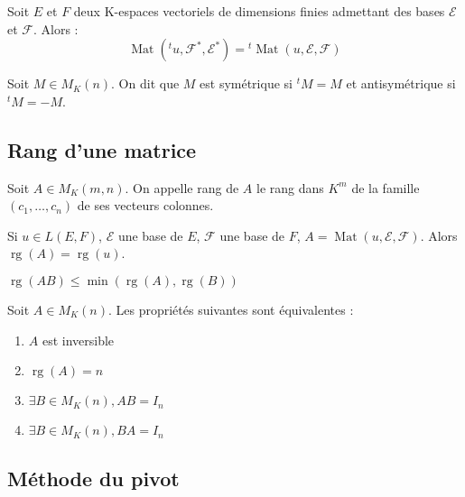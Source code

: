 \begin{thm}
Soit $E$ et $F$ deux K-espaces vectoriels de dimensions finies admettant des bases $\mathcal{E}$ et $\mathcal{F}$. Alors :
\[ \operatorname{Mat}({}^tu,\mathcal{F}^*,\mathcal{E}^*) = {}^t\operatorname{Mat}(u,\mathcal{E},\mathcal{F}) \]
\end{thm}

\begin{de}
Soit $M \in M_K(n)$. On dit que $M$ est symétrique si ${}^tM = M$ et antisymétrique si ${}^tM = -M$.
\end{de}

\subsection{Rang d'une matrice}

\begin{de}
Soit $A \in M_K(m,n)$. On appelle rang de $A$ le rang dans $K^m$ de la famille $(c_1,\ldots,c_n)$ de ses vecteurs colonnes.
\end{de}

\begin{thm}
Si $u \in L(E,F)$, $\mathcal{E}$ une base de $E$, $\mathcal{F}$ une base de $F$, $A = \operatorname{Mat}(u,\mathcal{E},\mathcal{F})$. Alors $\operatorname{rg}(A) = \operatorname{rg}(u)$.
\end{thm}

\begin{cor}
$\operatorname{rg}(AB) \leq \min(\operatorname{rg}(A),\operatorname{rg}(B))$
\end{cor}

\begin{thm}
Soit $A \in M_K(n)$. Les propriétés suivantes sont équivalentes :
\begin{enumerate}
\item $A$ est inversible
\item $\operatorname{rg}(A) = n$
\item $\exists B \in M_K(n), AB = I_n$
\item $\exists B \in M_K(n), BA = I_n$
\end{enumerate}
\end{thm}

\subsection{Méthode du pivot}

